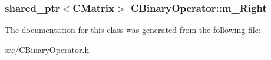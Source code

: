 \subsubsection[{\texorpdfstring{m\+\_\+\+Right}{m_Right}}]{\setlength{\rightskip}{0pt plus 5cm}shared\+\_\+ptr$<${\bf C\+Matrix}$>$ C\+Binary\+Operator\+::m\+\_\+\+Right\hspace{0.3cm}{\ttfamily [protected]}}\hypertarget{classCBinaryOperator_a5588bc0fa7e3ca62ef3dbdb23d96f920}{}\label{classCBinaryOperator_a5588bc0fa7e3ca62ef3dbdb23d96f920}


The documentation for this class was generated from the following file\+:\begin{DoxyCompactItemize}
\item 
src/\hyperlink{CBinaryOperator_8h}{C\+Binary\+Operator.\+h}\end{DoxyCompactItemize}
